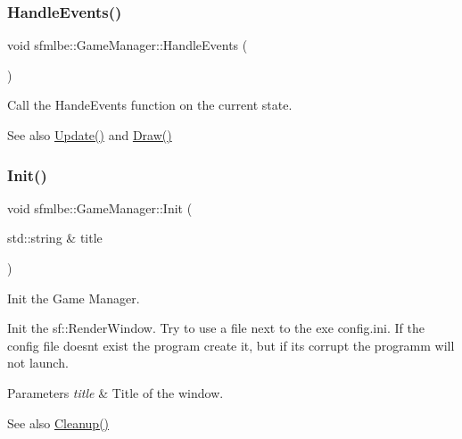 \subsubsection{\texorpdfstring{Handle\+Events()}{HandleEvents()}}
{\footnotesize\ttfamily void sfmlbe\+::\+Game\+Manager\+::\+Handle\+Events (\begin{DoxyParamCaption}{ }\end{DoxyParamCaption})}



Call the Hande\+Events function on the current state. 

\begin{DoxySeeAlso}{See also}
\mbox{\hyperlink{classsfmlbe_1_1_game_manager_a895a0457b48b9ccd36194a345b04b547}{Update()}} and \mbox{\hyperlink{classsfmlbe_1_1_game_manager_a6c8377c22718038d018ebe7e26d3bdc3}{Draw()}} 
\end{DoxySeeAlso}
\mbox{\label{classsfmlbe_1_1_game_manager_a120f841a7f3cb2dfe21b78984c3e83bf}} 
\subsubsection{\texorpdfstring{Init()}{Init()}}
{\footnotesize\ttfamily void sfmlbe\+::\+Game\+Manager\+::\+Init (\begin{DoxyParamCaption}\item[{std\+::string \&}]{title }\end{DoxyParamCaption})}



Init the Game Manager. 

Init the sf\+::\+Render\+Window. Try to use a file next to the exe \textquotesingle{}config.\+ini\textquotesingle{}. If the config file doesn\textquotesingle{}t exist the program create it, but if it\textquotesingle{}s corrupt the programm will not launch. 
\begin{DoxyParams}{Parameters}
{\em title} & Title of the window. \\
\hline
\end{DoxyParams}
\begin{DoxySeeAlso}{See also}
\mbox{\hyperlink{classsfmlbe_1_1_game_manager_a718bd72362c1ba9504ca0852b2073f1b}{Cleanup()}} 
\end{DoxySeeAlso}
\mbox{\label{classsfmlbe_1_1_game_manager_a2c80186d2de5b168900bb91b05eb11ee}} 
